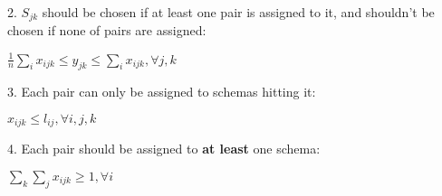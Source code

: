 2. $S_{jk}$ should be chosen if at least one pair is assigned to it,
and shouldn't be chosen if none of pairs are assigned:
\begin{center}
  $\frac 1n \sum\nolimits_i x_{ijk} \leq y_{jk} \leq \sum\nolimits_i x_{ijk}, \forall j,k$
\end{center}

3. Each pair can only be assigned to schemas hitting it:
\begin{center}
  $x_{ijk} \leq l_{ij}, \forall i,j,k$
\end{center}

4. Each pair should be assigned to \textbf{at least} one schema:
\begin{center}
  $\sum\nolimits_k \sum\nolimits_j x_{ijk} \geq 1, \forall i$
\end{center}
